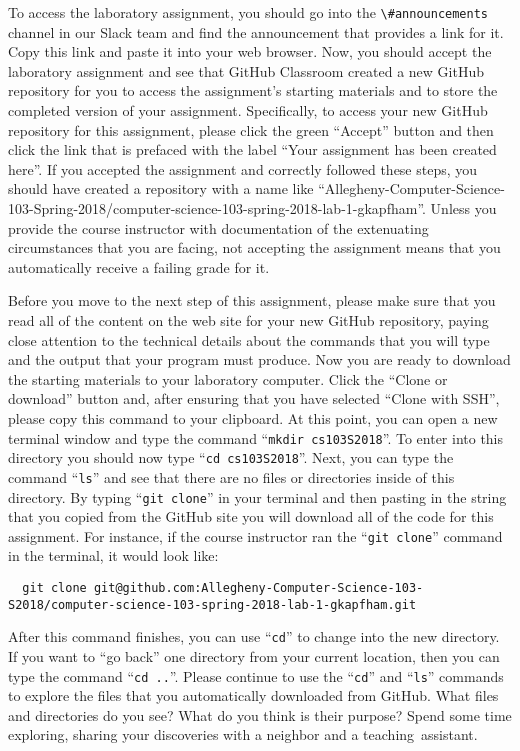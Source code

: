 \documentclass[11pt]{article}
\newcommand{\command}[1]{``\lstinline{#1}''}
\newcommand{\channel}[1]{\lstinline{#1}}
\newcommand{\step}[1]{``{#1}''}
\begin{document}
To access the laboratory assignment, you should go into the \channel{\#announcements} channel in our Slack team and find
the announcement that provides a link for it. Copy this link and paste it into your web browser. Now, you should accept
the laboratory assignment and see that GitHub Classroom created a new GitHub repository for you to access the
assignment's starting materials and to store the completed version of your assignment. Specifically, to access your new
GitHub repository for this assignment, please click the green ``Accept'' button and then click the link that is prefaced
with the label ``Your assignment has been created here''. If you accepted the assignment and correctly followed these
steps, you should have created a repository with a name like
``Allegheny-Computer-Science-103-Spring-2018/computer-science-103-spring-2018-lab-1-gkapfham''. Unless you provide the
course instructor with documentation of the extenuating circumstances that you are facing, not accepting the assignment
means that you automatically receive a failing grade for it.

Before you move to the next step of this assignment, please make sure that you read all of the content on the web site
for your new GitHub repository, paying close attention to the technical details about the commands that you will type
and the output that your program must produce. Now you are ready to download the starting materials to your laboratory
computer. Click the ``Clone or download'' button and, after ensuring that you have selected ``Clone with SSH'', please
copy this command to your clipboard. At this point, you can open a new terminal window and type the command
\command{mkdir cs103S2018}. To enter into this directory you should now type \command{cd cs103S2018}. Next, you can type
the command \command{ls} and see that there are no files or directories inside of this directory. By typing \command{git
clone} in your terminal and then pasting in the string that you copied from the GitHub site you will download all of the
code for this assignment. For instance, if the course instructor ran the \command{git clone} command in the terminal, it
would look like:

\begin{lstlisting}
  git clone git@github.com:Allegheny-Computer-Science-103-S2018/computer-science-103-spring-2018-lab-1-gkapfham.git
\end{lstlisting}

After this command finishes, you can use \command{cd} to change into the new directory. If you want to \step{go back}
one directory from your current location, then you can type the command \command{cd ..}. Please continue to use the
\command{cd} and \command{ls} commands to explore the files that you automatically downloaded from GitHub. What files
and directories do you see? What do you think is their purpose? Spend some time exploring, sharing your discoveries with
a neighbor and a \mbox{teaching assistant}.
\end{document}

